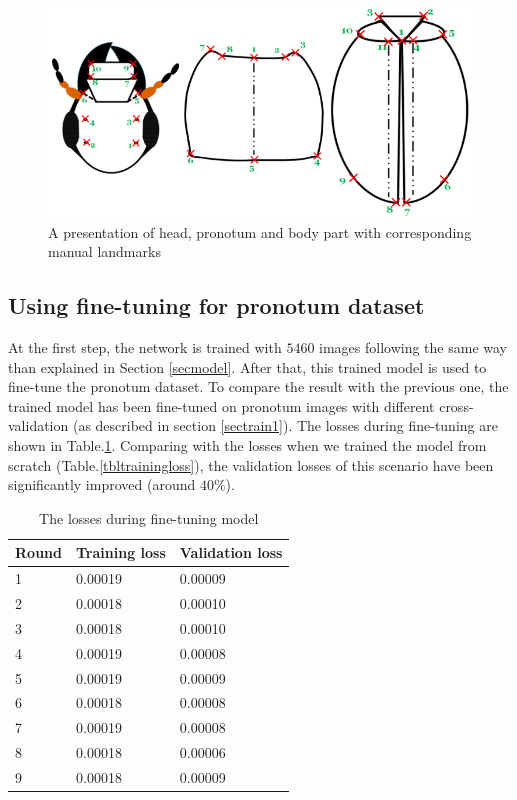 \documentclass[10pt]{article}
\begin{document}
\begin{figure}[htbp]
        \centering
        \includegraphics[scale=0.3]{images/merge}
    \caption{\small{A presentation of head, pronotum and body part with corresponding manual landmarks}} 
    \label{figshape3parts}
\end{figure}

\subsection{Using fine-tuning for pronotum dataset}
At the first step, the network is trained with $5460$ images following
the same way than explained in Section \ref{secmodel}. After that, 
this trained model is used to fine-tune the pronotum dataset. To compare the result with
the previous one, the trained model has been fine-tuned on pronotum images with different cross-validation (as described in section \ref{sectrain1}). The losses during fine-tuning are shown in
Table.\ref{tblfinetuningloss}. Comparing with the losses when we
trained the model from scratch (Table.\ref{tbltrainingloss}), the
validation losses of this scenario have been significantly improved (around
$40\%$).
\begin{table}[h!]
	\centering
	\begin{tabular}{l l l}
	Round & Training loss & Validation loss \\ \hline
	1 & 0.00019 & 0.00009  \\ \hline
	2 & 0.00018 & 0.00010 \\ \hline
	3 & 0.00018 & 0.00010 \\ \hline
	4 & 0.00019 & 0.00008 \\ \hline
	5 & 0.00019 & 0.00009 \\ \hline
	6 & 0.00018 & 0.00008 \\ \hline
	7 & 0.00019 & 0.00008 \\ \hline
	8 & 0.00018 & 0.00006 \\ \hline
	9 & 0.00018 & 0.00009 \\ \hline
	\end{tabular}
	\caption{\small{The losses during fine-tuning model}}
	\label{tblfinetuningloss}
\end{table}
\end{document}
